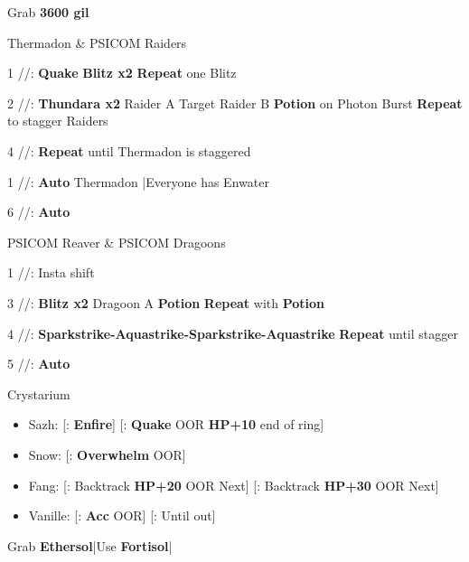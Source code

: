 \begin{mainlist}
	\item Grab \textbf{3600 gil}
\end{mainlist}
\begin{fight}{Thermadon \& PSICOM Raiders}
	\item [1] \com/\syn/\com: \textbf{Quake} \to \textbf{Blitz x2} \to \textbf{Repeat} one Blitz
	\item [2] \rav/\rav/\rav: \textbf{Thundara x2} Raider A \to Target Raider B \to \textbf{Potion} on Photon Burst \to \textbf{Repeat} to stagger Raiders
	\item [4] \rav/\rav/\rav: \textbf{Repeat} until Thermadon is staggered
	\item [1] \com/\syn/\com: \textbf{Auto} Thermadon |Everyone has Enwater
	\item [6] \com/\com/\com: \textbf{Auto}
\end{fight}
\begin{fight}{PSICOM Reaver \& PSICOM Dragoons}
	\item [1] \com/\syn/\com: Insta shift
	\item [3] \com/\syn/\sen: \textbf{Blitz x2} Dragoon A \to \textbf{Potion} \to \textbf{Repeat} with \textbf{Potion}
	\item [4] \rav/\rav/\rav: \textbf{Sparkstrike-Aquastrike-Sparkstrike-Aquastrike} \to \textbf{Repeat} until stagger
	\item [5] \com/\com/\com: \textbf{Auto}
\end{fight}
\begin{menu}
	\item Crystarium
	\begin{itemize}
		\item Sazh: [\syn: \textbf{Enfire}] [\com: \textbf{Quake} OOR \to \textbf{HP+10} end of ring]
		\item Snow: [\rav: \textbf{Overwhelm} OOR]
		\item Fang: [\com: Backtrack \textbf{HP+20} OOR \to Next] [\sab: Backtrack \textbf{HP+30} OOR \to Next]
		\item Vanille: [\sab: \textbf{Acc} OOR] [\med: Until out]
	\end{itemize}
\end{menu}
\begin{mainlist}
	\item Grab \textbf{Ethersol}|Use \textbf{Fortisol}|\skip
\end{mainlist}
